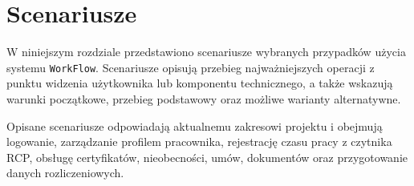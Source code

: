 \section{Scenariusze}

W niniejszym rozdziale przedstawiono scenariusze wybranych przypadków użycia systemu \texttt{WorkFlow}. Scenariusze opisują przebieg najważniejszych operacji z punktu widzenia użytkownika lub komponentu technicznego, a także wskazują warunki początkowe, przebieg podstawowy oraz możliwe warianty alternatywne.

Opisane scenariusze odpowiadają aktualnemu zakresowi projektu i obejmują logowanie, zarządzanie profilem pracownika, rejestrację czasu pracy z czytnika RCP, obsługę certyfikatów, nieobecności, umów, dokumentów oraz przygotowanie danych rozliczeniowych.

